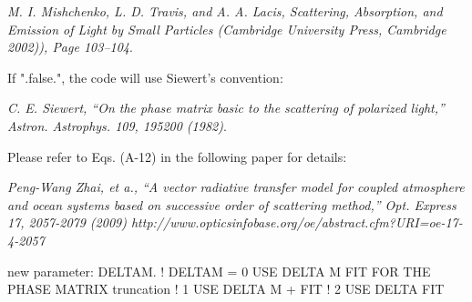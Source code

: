 \documentclass[10pt,letterpaper]{article}
\begin{document}
{\it M. I. Mishchenko, L. D. Travis, and A. A. Lacis, Scattering, Absorption, and Emission of Light by Small Particles
(Cambridge University Press, Cambridge 2002)), Page 103--104}.


If ".false.", the code will use Siewert's convention:

{\it C. E. Siewert, ``On the phase matrix basic to the scattering of polarized light,'' Astron. Astrophys. 109, 195200 (1982)}.

Please refer to Eqs. (A-12) in the following paper for details:

{\it Peng-Wang Zhai, et a., ``A vector radiative transfer model for coupled atmosphere and ocean systems based on successive order of scattering method,'' Opt. Express 17, 2057-2079 (2009) 
http://www.opticsinfobase.org/oe/abstract.cfm?URI=oe-17-4-2057}

new parameter: DELTAM. 
! DELTAM = 0 USE DELTA M FIT FOR THE PHASE MATRIX truncation
!          1 USE DELTA M + FIT
!          2 USE DELTA FIT
\end{document}
